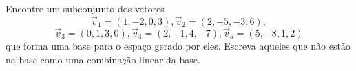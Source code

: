\begin{frame}[label=lild]
\begin{casa} Encontre um subconjunto dos vetores 
\[\vec{v}_1=(1,-2,0,3), \vec{v}_2=(2,-5,-3,6),
\]
\[\vec{v}_3=(0,1,3,0), \vec{v}_4=(2,-1,4,-7), \vec{v}_5=(5,-8,1,2)
\]
que forma uma base para o espaço gerado por eles. Escreva aqueles que não estão na base como uma combinação linear da base. 

\end{casa}
\end{frame}

%
%
%

